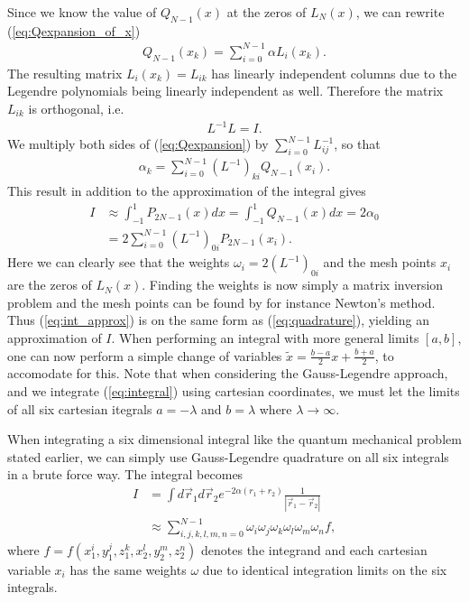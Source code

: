 \documentclass[10pt, twocolumn]{aastex62}
\begin{document}
Since we know the value of $Q_{N-1}(x)$ at the zeros of $L_N(x)$, we can rewrite
(\ref{eq:Qexpansion_of_x})
\begin{align}
	Q_{N-1} (x_k)= \sum^{N-1}_{i=0} \alpha L_i(x_k).
	\label{eq:Qexpansion}
\end{align}
The resulting matrix $L_i(x_k) = L_{ik}$ has linearly independent columns due to
the Legendre polynomials being linearly independent as well. Therefore the
matrix $L_{ik}$ is orthogonal, i.e.
\begin{align}
	L^{-1}L = I.
\end{align}
We multiply both sides of (\ref{eq:Qexpansion}) by
$\sum^{N-1}_{i=0}L^{-1}_{ij}$, so that 
\begin{align}
	\alpha_k = \sum_{i=0}^{N-1} (L^{-1})_{ki}Q_{N-1}(x_i).
\end{align}
This result in addition to the approximation of the integral gives
\begin{align}
	I &\approx \int^1_{-1} P_{2N-1}(x)dx = \int^1_{-1} Q_{N-1}(x)dx = 2\alpha_0 \\
	&= 2 \sum^{N-1}_{i=0} (L^{-1})_{0i}P_{2N-1}(x_i).
	\label{eq:int_approx}
\end{align}
Here we can clearly see that the weights $\omega_i = 2(L^{-1})_{0i}$ and the
mesh points $x_i$ are the zeros of $L_N(x)$. Finding the weights is now simply a
matrix inversion problem and the mesh points can be found by for instance Newton's
method. Thus (\ref{eq:int_approx}) is on the same form as (\ref{eq:quadrature}),
yielding an approximation of $I$. When performing an integral with more general
limits $[a,b]$, one can now perform a simple change of variables $\tilde{x} =
\frac{b - a}{2}x + \frac{b + a}{2}$, to accomodate for this. Note that when
considering the Gauss-Legendre approach, and we integrate (\ref{eq:integral})
using cartesian coordinates, we must let the limits of all six cartesian
itegrals $a = -\lambda$ and $b = \lambda$ where $\lambda\to\infty$.

When integrating a six dimensional integral like the quantum mechanical problem
stated earlier, we can simply use Gauss-Legendre quadrature on all six integrals
in a brute force way. The integral becomes 
\begin{align}
	I &= \int d\vec{r}_1d\vec{r}_2 e^{-2\alpha(r_1 + r_2)}\frac{1}{|\vec{r}_1 - \vec{r}_2|} \\
	&\approx \sum_{i, j, k, l, m, n = 0}^{N-1} \omega_i \omega_j \omega_k \omega_l \omega_m \omega_n f,
\end{align} 
where $f = f(x_1^i, y_1^j, z_1^k, x_2^l, y_2^m, z_2^n)$ denotes the integrand
and each cartesian variable $x_i$ has the same weights $\omega$ due to identical
integration limits on the six integrals. 
\end{document}
